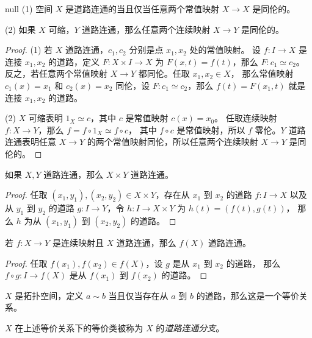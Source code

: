 \documentclass[fontset=none]{Notes}
\begin{document}
\begin{problem}{}{null}
  (1) 空间 $X$ 是道路连通的当且仅当任意两个常值映射
    $X\to X$ 是同伦的。

  (2) 如果 $X$ 可缩，$Y$ 道路连通，那么任意两个连续映射 $X\to Y$
  是同伦的。
\end{problem}
\begin{proof}
  (1) 若 $X$ 道路连通，$c_1,c_2$ 分别是点 $x_1,x_2$ 处的常值映射。
  设 $f:I\to X$ 是连接 $x_1,x_2$ 的道路，定义 $F:X\times I\to X$
  为 $F(x,t)=f(t)$，那么 $F:c_1\simeq c_2$。
  反之，若任意两个常值映射 $X\to Y$ 都同伦。任取 $x_1,x_2\in X$，
  那么常值映射 $c_1(x)=x_1$ 和 $c_2(x)=x_2$ 同伦，设 
  $F:c_1\simeq c_2$，那么 $f(t)=F(x_1,t)$ 就是连接 $x_1,x_2$ 的道路。

  (2) $X$ 可缩表明 $1_X\simeq c$，其中 $c$ 是常值映射 $c(x)=x_0$。
  任取连续映射 $f:X\to Y$，那么 $f=f\circ 1_X\simeq f\circ c$，
  其中 $f\circ c$ 是常值映射，所以 $f$ 零伦。$Y$ 道路连通表明任意
  $X\to Y$ 的两个常值映射同伦，所以任意两个连续映射 $X\to Y$
  是同伦的。
\end{proof}

\begin{problem}{}{}
  如果 $X,Y$ 道路连通，那么 $X\times Y$ 道路连通。
\end{problem}
\begin{proof}
  任取 $(x_1,y_1),(x_2,y_2)\in X\times Y$，存在从 $x_1$
  到 $x_2$ 的道路 $f:I\to X$ 以及从 $y_1$ 到 $y_2$ 的道路
  $g:I\to Y$，令 $h:I\to X\times Y$ 为 $h(t)=(f(t),g(t))$，
  那么 $h$ 为从 $(x_1,y_1)$ 到 $(x_2,y_2)$ 的道路。
\end{proof}

\begin{problem}{}{}
  若 $f:X\to Y$ 是连续映射且 $X$ 道路连通，那么 $f(X)$ 道路连通。
\end{problem}
\begin{proof}
  任取 $f(x_1),f(x_2)\in f(X)$，设 $g$ 是从 $x_1$ 到 $x_2$ 的道路，
  那么 $f\circ g:I\to f(X)$ 是从 $f(x_1)$ 到 $f(x_2)$ 的道路。
\end{proof}

\begin{theorem}
  $X$ 是拓扑空间，定义 $a\sim b$ 当且仅当存在从 $a$ 到 $b$
  的道路，那么这是一个等价关系。
\end{theorem}

\begin{definition}
  $X$ 在上述等价关系下的等价类被称为 $X$ 的\emph{道路连通分支}。 
\end{definition}
\end{document}
